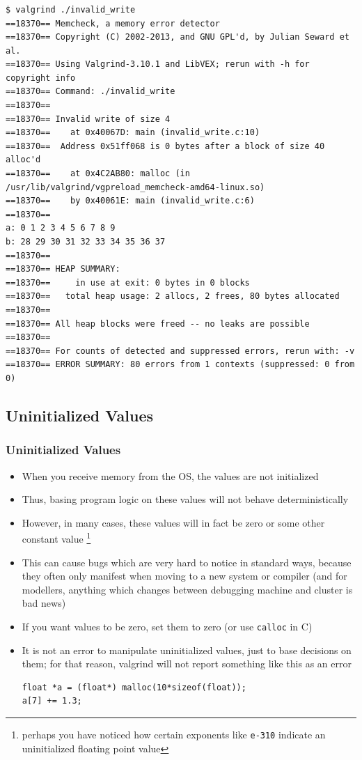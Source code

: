 \documentclass{beamer}
\begin{document}
\begin{frame}[fragile]
  \frametitle{}
  \begin{lstlisting}
$ valgrind ./invalid_write
==18370== Memcheck, a memory error detector
==18370== Copyright (C) 2002-2013, and GNU GPL'd, by Julian Seward et al.
==18370== Using Valgrind-3.10.1 and LibVEX; rerun with -h for copyright info
==18370== Command: ./invalid_write
==18370==
==18370== Invalid write of size 4
==18370==    at 0x40067D: main (invalid_write.c:10)
==18370==  Address 0x51ff068 is 0 bytes after a block of size 40 alloc'd
==18370==    at 0x4C2AB80: malloc (in /usr/lib/valgrind/vgpreload_memcheck-amd64-linux.so)
==18370==    by 0x40061E: main (invalid_write.c:6)
==18370==
a: 0 1 2 3 4 5 6 7 8 9
b: 28 29 30 31 32 33 34 35 36 37
==18370==
==18370== HEAP SUMMARY:
==18370==     in use at exit: 0 bytes in 0 blocks
==18370==   total heap usage: 2 allocs, 2 frees, 80 bytes allocated
==18370==
==18370== All heap blocks were freed -- no leaks are possible
==18370==
==18370== For counts of detected and suppressed errors, rerun with: -v
==18370== ERROR SUMMARY: 80 errors from 1 contexts (suppressed: 0 from 0)
  \end{lstlisting}
\end{frame}

\subsection{Uninitialized Values}

\begin{frame}[fragile]
  \frametitle{Uninitialized Values}
  \begin{itemize}
    \item When you receive memory from the OS, the values are not initialized
      \item Thus, basing program logic on these values will not behave deterministically
      \item However, in many cases, these values will in fact be zero or some other constant value \footnote{perhaps you have noticed how certain exponents like \texttt{e-310} indicate an uninitialized floating point value}
      \item This can cause bugs which are very hard to notice in standard ways, because they often only manifest when moving to a new system or compiler (and for modellers, anything which changes between debugging machine and cluster is bad news)
      \item If you want values to be zero, set them to zero (or use \texttt{calloc} in C)
        \item It is not an error to manipulate uninitialized values, just to base decisions on them; for that reason, valgrind will not report something like this as an error
          \begin{lstlisting}
float *a = (float*) malloc(10*sizeof(float));
a[7] += 1.3;
          \end{lstlisting}
  \end{itemize}
\end{frame}
\end{document}
